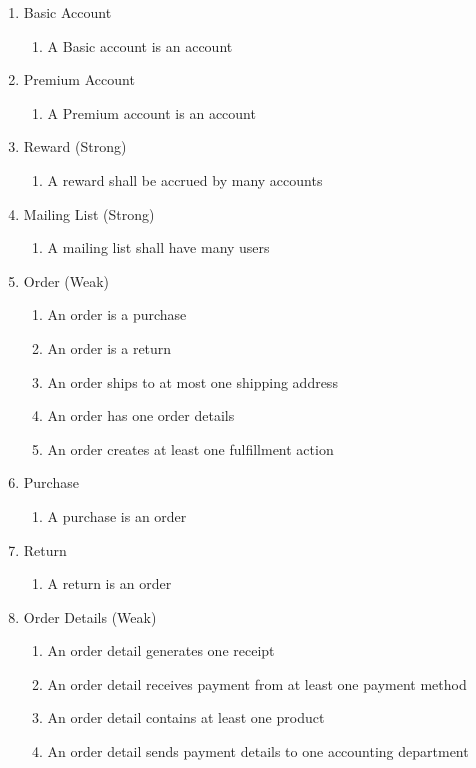 \begin{enumerate}
\item Basic Account
\begin{enumerate}
	\item A Basic account is an account
\end{enumerate}
	
\item Premium Account
\begin{enumerate}
	\item A Premium account is an account
\end{enumerate}

\item Reward (Strong)
\begin{enumerate}
	\item A reward shall be accrued by many accounts
\end{enumerate}
	
\item Mailing List (Strong)
\begin{enumerate}
	\item A mailing list shall have many users
\end{enumerate}

\item Order (Weak)
\begin{enumerate}
	\item An order is a purchase
	\item An order is a return
	\item An order ships to at most one shipping address
	\item An order has one order details
	\item An order creates at least one fulfillment action
\end{enumerate}

\item Purchase
\begin{enumerate}
	\item A purchase is an order
\end{enumerate}

\item Return
\begin{enumerate}
	\item A return is an order
\end{enumerate}

\item Order Details (Weak)
\begin{enumerate}
	\item An order detail generates one receipt
	\item An order detail receives payment from at least one payment method
	\item An order detail contains at least one product
	\item An order detail sends payment details to one accounting department
\end{enumerate}
	

\end{enumerate}
